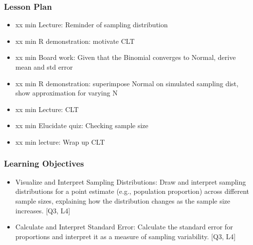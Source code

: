 

\begin{frame}
\frametitle{Lesson Plan}
\begin{itemize}
    \item xx min Lecture: Reminder of sampling distribution
    \item xx min R demonstration: motivate CLT
    \item xx min Board work: Given that the Binomial converges to Normal, derive mean and std error
    \item xx min R demonstration: superimpose Normal on simulated sampling dist, show approximation for varying N
    \item xx min Lecture: CLT
    \item xx min Elucidate quiz: Checking sample size
    \item xx min lecture: Wrap up CLT
 \end{itemize}
\end{frame}
    
\begin{frame}
\frametitle{Learning Objectives}
\begin{itemize}
    \item Visualize and Interpret Sampling Distributions: Draw and interpret sampling distributions for a point estimate (e.g., population proportion) across different sample sizes, explaining how the distribution changes as the sample size increases. [Q3, L4] 
    \item Calculate and Interpret Standard Error: Calculate the standard error for proportions and interpret it as a measure of sampling variability. [Q3, L4]
\end{itemize}
\end{frame}


